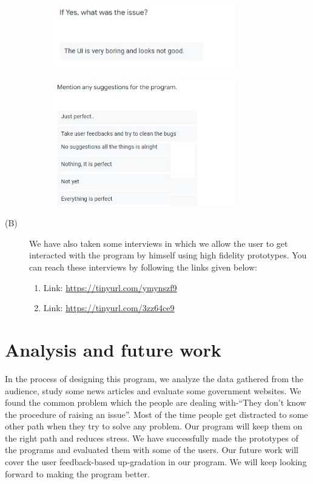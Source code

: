 \documentclass[acmtog]{acmart}
\begin{document}
\begin{description}
\begin{figure}[H]
    \end{figure}
    \begin{figure}[H]
        \includegraphics[width=8cm]{Evaluation/q5.jpg}
    \end{figure}
    \begin{figure}[H]
        \includegraphics[width=8cm]{Evaluation/q6.jpg}
    \end{figure}

    \item[(B)] We have also taken some interviews in which we allow the user to get interacted with the program by himself using high fidelity prototypes. You can reach these interviews by following the links given below:

    \begin{enumerate}
        \item Link: \url{https://tinyurl.com/ymynszf9}
        \item Link: \url{https://tinyurl.com/3zz64ce9}
    \end{enumerate}
\end{description}


\section*{Analysis and future work}
In the process of designing this program, we analyze the data gathered from the audience, study some news articles and evaluate some government websites. We found the common problem which the people are dealing with-“They don’t know the procedure of raising an issue”.
Most of the time people get distracted to some other path when they try to solve any problem.
Our program will keep them on the right path and reduces stress. We have successfully made the prototypes of the programs and evaluated them with some of the users. Our future work will cover the user feedback-based up-gradation in our program. We will keep looking forward to making the program better.
\end{document}
